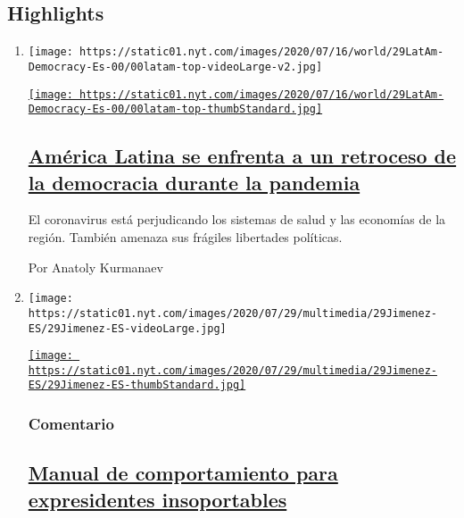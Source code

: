 \hypertarget{highlights}{%
\subsection{Highlights}\label{highlights}}

\begin{enumerate}
\def\labelenumi{\arabic{enumi}.}
\item
  \texttt{[image: https://static01.nyt.com/images/2020/07/16/world/29LatAm-Democracy-Es-00/00latam-top-videoLarge-v2.jpg]}

  \href{/es/2020/07/29/espanol/america-latina/democracia-america-latina-pandemia.html}{\texttt{[image: https://static01.nyt.com/images/2020/07/16/world/29LatAm-Democracy-Es-00/00latam-top-thumbStandard.jpg]}}

  \hypertarget{amuxe9rica-latina-se-enfrenta-a-un-retroceso-de-la-democracia-durante-la-pandemia}{%
  \subsection{\texorpdfstring{\href{/es/2020/07/29/espanol/america-latina/democracia-america-latina-pandemia.html}{América
  Latina se enfrenta a un retroceso de la democracia durante la
  pandemia}}{América Latina se enfrenta a un retroceso de la democracia durante la pandemia}}\label{amuxe9rica-latina-se-enfrenta-a-un-retroceso-de-la-democracia-durante-la-pandemia}}

  El coronavirus está perjudicando los sistemas de salud y las economías
  de la región. También amenaza sus frágiles libertades políticas.

  Por Anatoly Kurmanaev
\item
  \texttt{[image: https://static01.nyt.com/images/2020/07/29/multimedia/29Jimenez-ES/29Jimenez-ES-videoLarge.jpg]}

  \href{/es/2020/07/29/espanol/opinion/espana-felipe-gonzalez-jose-maria-aznar.html}{\texttt{[image: https://static01.nyt.com/images/2020/07/29/multimedia/29Jimenez-ES/29Jimenez-ES-thumbStandard.jpg]}}

  \hypertarget{comentario}{%
  \subsubsection{Comentario}\label{comentario}}

  \hypertarget{manual-de-comportamiento-para-expresidentes-insoportables}{%
  \subsection{\texorpdfstring{\href{/es/2020/07/29/espanol/opinion/espana-felipe-gonzalez-jose-maria-aznar.html}{Manual
  de comportamiento para expresidentes
  insoportables}}{Manual de comportamiento para expresidentes insoportables}}\label{manual-de-comportamiento-para-expresidentes-insoportables}}


\end{enumerate}
